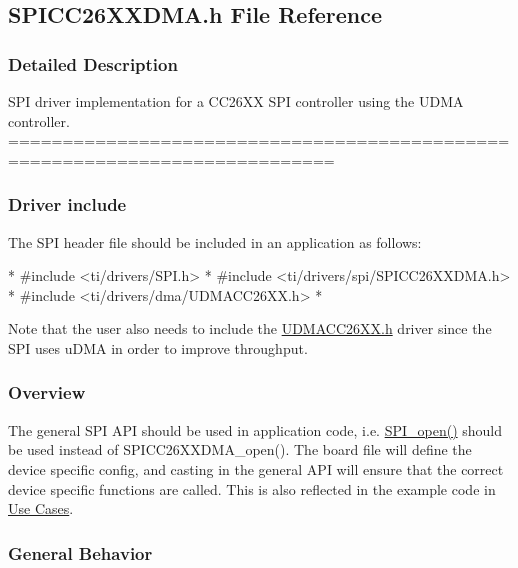 \subsection{S\-P\-I\-C\-C26\-X\-X\-D\-M\-A.\-h File Reference}
\label{_s_p_i_c_c26_x_x_d_m_a_8h}


\subsubsection{Detailed Description}
S\-P\-I driver implementation for a C\-C26\-X\-X S\-P\-I controller using the U\-D\-M\-A controller. ============================================================================

\subsubsection*{Driver include}

The S\-P\-I header file should be included in an application as follows\-: 
\begin{DoxyCode}
*  #include <ti/drivers/SPI.h>
*  #include <ti/drivers/spi/SPICC26XXDMA.h>
*  #include <ti/drivers/dma/UDMACC26XX.h>
*  
\end{DoxyCode}
 Note that the user also needs to include the \hyperlink{_u_d_m_a_c_c26_x_x_8h}{U\-D\-M\-A\-C\-C26\-X\-X.\-h} driver since the S\-P\-I uses u\-D\-M\-A in order to improve throughput.

\subsubsection*{Overview}

The general S\-P\-I A\-P\-I should be used in application code, i.\-e. \hyperlink{_s_p_i_8h_a62cfe494cb1df47cd602e8747e894fd1}{S\-P\-I\-\_\-open()} should be used instead of S\-P\-I\-C\-C26\-X\-X\-D\-M\-A\-\_\-open(). The board file will define the device specific config, and casting in the general A\-P\-I will ensure that the correct device specific functions are called. This is also reflected in the example code in \hyperlink{_s_p_i_c_c26_x_x_d_m_a_8h_USE_CASES_SPI}{Use Cases}.

\subsubsection*{General Behavior}

